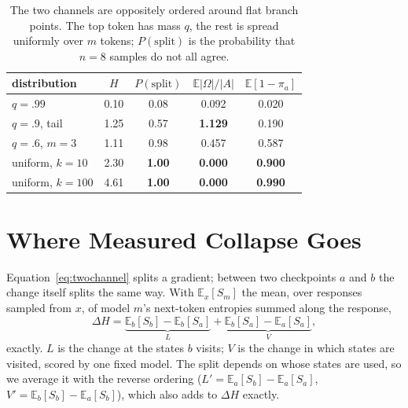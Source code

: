 \documentclass[runningheads]{llncs}
\newcommand{\Om}{\Omega}
\newcommand{\E}{\mathbb{E}}
\begin{document}
\begin{table}[t]
\caption{The two channels are oppositely ordered around flat branch points. The top
token has mass $q$, the rest is spread uniformly over $m$ tokens; $P(\mathrm{split})$
is the probability that $n{=}8$ samples do not all agree.}
\label{tab:anticorr}
\centering
\setlength{\tabcolsep}{6pt}
\begin{tabular}{@{}lcccc@{}}
\toprule
distribution & $H$ & $P(\mathrm{split})$ & $\E|\Om|/|A|$ & $\E[1{-}\pi_a]$ \\
\midrule
$q{=}.99$          & 0.10 & 0.08 & 0.092 & 0.020 \\
$q{=}.9$, tail     & 1.25 & 0.57 & \textbf{1.129} & 0.190 \\
$q{=}.6$, $m{=}3$  & 1.11 & 0.98 & 0.457 & 0.587 \\
uniform, $k{=}10$  & 2.30 & \textbf{1.00} & \textbf{0.000} & \textbf{0.900} \\
uniform, $k{=}100$ & 4.61 & \textbf{1.00} & \textbf{0.000} & \textbf{0.990} \\
\bottomrule
\end{tabular}
\end{table}

\section{Where Measured Collapse Goes}
\label{sec:decomp}

Equation~\eqref{eq:twochannel} splits a gradient; between two checkpoints $a$ and $b$
the change itself splits the same way. With $\E_x[S_m]$ the mean, over responses
sampled from $x$, of model $m$'s next-token entropies summed along the response,
\begin{equation}
\Delta H = \underbrace{\E_b[S_b] - \E_b[S_a]}_{L}
         + \underbrace{\E_b[S_a] - \E_a[S_a]}_{V},
\label{eq:split}
\end{equation}
exactly. $L$ is the change at the states $b$ visits; $V$ is the change in which states
are visited, scored by one fixed model. The split depends on whose states are used, so
we average it with the reverse ordering ($L' = \E_a[S_b] - \E_a[S_a]$,
$V' = \E_b[S_b] - \E_a[S_b]$), which also adds to $\Delta H$ exactly.
\end{document}

